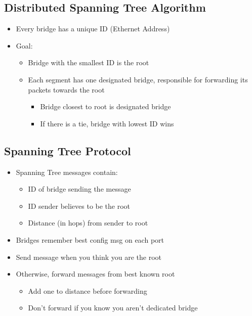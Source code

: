 \subsection{Distributed Spanning Tree Algorithm}
\begin{itemize}[nosep]
    \item Every bridge has a unique ID (Ethernet Address)
    \item Goal:
          \begin{itemize}[nosep]
              \item Bridge with the smallest ID is the root
              \item Each segment has one designated bridge, responsible for forwarding its packets towards the root
                    \begin{itemize}[nosep]
                        \item Bridge closest to root is designated bridge
                        \item If there is a tie, bridge with lowest ID wins
                    \end{itemize}
          \end{itemize}
\end{itemize}

\subsection{Spanning Tree Protocol}
\begin{itemize}[nosep]
    \item Spanning Tree messages contain:
          \begin{itemize}[nosep]
              \item ID of bridge sending the message
              \item ID sender believes to be the root
              \item Distance (in hops) from sender to root
          \end{itemize}
    \item Bridges remember best config msg on each port
    \item Send message when you think you are the root
    \item Otherwise, forward messages from best known root
          \begin{itemize}[nosep]
              \item Add one to distance before forwarding
              \item Don't forward if you know you aren't dedicated bridge
          \end{itemize}
\end{itemize}

